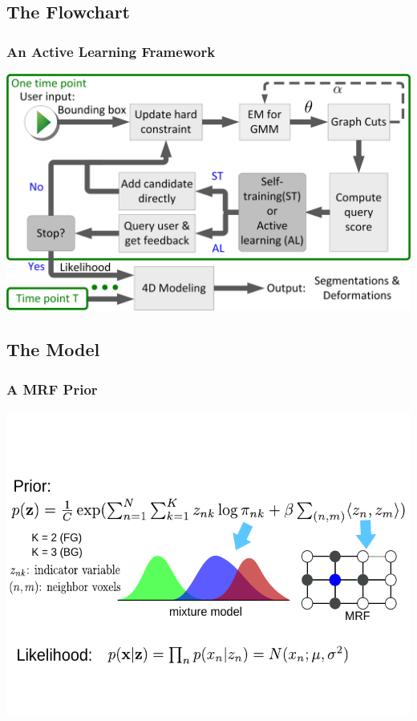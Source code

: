 \documentclass[sansserif, 10pt]{beamer}
\begin{document}
\subsection{The Flowchart}
\begin{frame}
  \frametitle{An Active Learning Framework}
  \includegraphics[width = 1\textwidth]{actlearn_fig/flowchart}
\end{frame}

\subsection{The Model}
\begin{frame}
\frametitle{A MRF Prior}
\includegraphics[width = 1\textwidth]{actlearn_fig/prior}
\end{frame}
\end{document}
